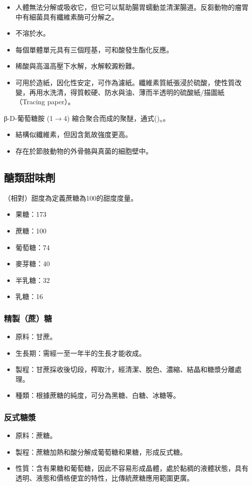 \documentclass[a4paper,12pt]{report}
\begin{document}
\begin{itemize}
\begin{itemize}
\begin{itemize}
\item 人體無法分解或吸收它，但它可以幫助腸胃蠕動並清潔腸道。反芻動物的瘤胃中有細菌具有纖維素酶可分解之。
\item 不溶於水。
\item 每個單體單元具有三個羥基，可和酸發生酯化反應。
\item 稀酸與高溫高壓下水解，水解較澱粉難。
\item 可用於造紙，因化性安定，可作為濾紙。纖維素質紙張浸於硫酸，使性質改變，再用水洗清，得質較硬、防水與油、薄而半透明的硫酸紙/描圖紙（Tracing paper）。
\end{itemize}
β-D-葡萄糖胺 (1$\to$4) 縮合聚合而成的聚醚，通式()$_n$。
\begin{itemize}
\item 結構似纖維素，但因含氮故強度更高。
\item 存在於節肢動物的外骨骼與真菌的細胞壁中。
\end{itemize}
\subsection{醣類甜味劑}
（相對）甜度為定義蔗糖為100的甜度度量。
\begin{itemize}
\item 果糖：173
\item 蔗糖：100
\item 葡萄糖：74
\item 麥芽糖：40
\item 半乳糖：32
\item 乳糖：16
\end{itemize}
\subsubsection{精製（蔗）糖}
\begin{itemize}
\item 原料：甘蔗。
\item 生長期：需經一至一年半的生長才能收成。
\item 製程：甘蔗採收後切段，榨取汁，經清潔、脫色、濃縮、結晶和糖漿分離處理。
\item 種類：根據蔗糖的純度，可分為黑糖、白糖、冰糖等。
\end{itemize}
\subsubsection{反式糖漿}
\begin{itemize}
\item 原料：蔗糖。
\item 製程：蔗糖加熱和酸分解成葡萄糖和果糖，形成反式糖。
\item 性質：含有果糖和葡萄糖，因此不容易形成晶體，處於黏稠的液體狀態，具有透明、液態和價格便宜的特性，比傳統蔗糖應用範圍更廣。
\end{itemize}

\end{itemize}
\end{itemize}
\end{document}
